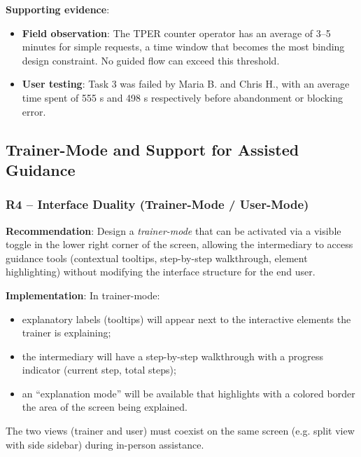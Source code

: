 ﻿\documentclass[11pt,a4paper]{article}
\begin{document}
\textbf{Supporting evidence}:
\begin{itemize}
    \item \textbf{Field observation}: The TPER counter operator has an average
    of 3--5 minutes for simple requests, a time window that
    becomes the most binding design constraint. No guided flow can
    exceed this threshold.
    \item \textbf{User testing}: Task 3 was failed by Maria B.
    and Chris H., with an average time spent of 555 s and 498 s respectively
    before abandonment or blocking error.
\end{itemize}



\subsection{Trainer-Mode and Support for Assisted Guidance}

\subsubsection{R4 -- Interface Duality (Trainer-Mode / User-Mode)}
\label{rec:R4}

\textbf{Recommendation}: Design a \textit{trainer-mode} that can be activated
via a visible toggle in the lower right corner of the screen,
allowing the intermediary to access guidance tools (contextual
tooltips, step-by-step walkthrough, element highlighting)
without modifying the interface structure for the end user.

\textbf{Implementation}: In trainer-mode:
\begin{itemize}
    \item explanatory labels (tooltips) will appear next to the
    interactive elements the trainer is explaining;
    \item the intermediary will have a step-by-step walkthrough with
    a progress indicator (current step, total steps);
    \item an ``explanation mode'' will be available that highlights with a
    colored border the area of the screen being explained.
\end{itemize}
The two views (trainer and user) must coexist on the same screen
(e.g. split view with side sidebar) during in-person assistance.
\end{document}
